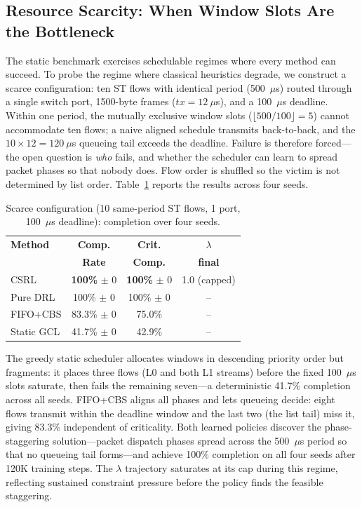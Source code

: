 \documentclass[conference]{IEEEtran}
\begin{document}
\subsection{Resource Scarcity: When Window Slots Are the Bottleneck}

The static benchmark exercises schedulable regimes where every method can succeed. To probe the regime where classical heuristics degrade, we construct a scarce configuration: ten ST flows with identical period (500~$\mu$s) routed through a single switch port, 1500-byte frames ($tx = 12~\mu$s), and a 100~$\mu$s deadline. Within one period, the mutually exclusive window slots ($\lfloor 500/100 \rfloor = 5$) cannot accommodate ten flows; a naive aligned schedule transmits back-to-back, and the $10 \times 12 = 120~\mu$s queueing tail exceeds the deadline. Failure is therefore forced---the open question is \emph{who} fails, and whether the scheduler can learn to spread packet phases so that nobody does. Flow order is shuffled so the victim is not determined by list order. Table~\ref{tab:scarcity} reports the results across four seeds.

\begin{table}[t]
\centering
\caption{Scarce configuration (10 same-period ST flows, 1 port, 100~$\mu$s deadline): completion over four seeds.}
\label{tab:scarcity}
\begin{tabular}{lccc}
\toprule
\textbf{Method} & \textbf{Comp.} & \textbf{Crit.} & $\lambda$ \\
                & \textbf{Rate} & \textbf{Comp.} & \textbf{final} \\
\midrule
CSRL & \textbf{100\%} $\pm$ 0 & \textbf{100\%} $\pm$ 0 & 1.0 (capped) \\
Pure DRL & 100\% $\pm$ 0 & 100\% $\pm$ 0 & -- \\
FIFO+CBS & 83.3\% $\pm$ 0 & 75.0\% & -- \\
Static GCL & 41.7\% $\pm$ 0 & 42.9\% & -- \\
\bottomrule
\end{tabular}
\end{table}

The greedy static scheduler allocates windows in descending priority order but fragments: it places three flows (L0 and both L1 streams) before the fixed 100~$\mu$s slots saturate, then fails the remaining seven---a deterministic 41.7\% completion across all seeds. FIFO+CBS aligns all phases and lets queueing decide: eight flows transmit within the deadline window and the last two (the list tail) miss it, giving 83.3\% independent of criticality. Both learned policies discover the phase-staggering solution---packet dispatch phases spread across the 500~$\mu$s period so that no queueing tail forms---and achieve 100\% completion on all four seeds after 120K training steps. The $\lambda$ trajectory saturates at its cap during this regime, reflecting sustained constraint pressure before the policy finds the feasible staggering.
\end{document}
